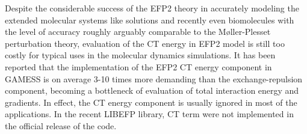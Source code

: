 Despite the considerable success of the EFP2 theory
in accurately modeling the extended molecular systems 
like solutions and recently even biomolecules
with the level of accuracy
roughly arguably comparable to the M{\o}ller\hyp{}Plesset perturbation theory,
evaluation of the CT energy in EFP2 model is still too costly for
typical uses in the
molecular dynamics simulations. It has been reported that 
the implementation of the EFP2 CT energy component in GAMESS
is on average 3-10 times more demanding than the exchange\hyp{}repulsion
component, becoming a bottleneck of evaluation of total interaction 
energy and gradients.\cite{Gordon.Smith.Xu.Slipchenko.AnnuRevPhysChem.2013,
Li.Gordon.Jensen.JCP.2006}
In effect, the CT energy component is usually ignored in most of the applications. In the 
recent LIBEFP library, CT term were not implemented in the official release 
of the code.\cite{Kaliman.Slipchenko.JCC.2015}


